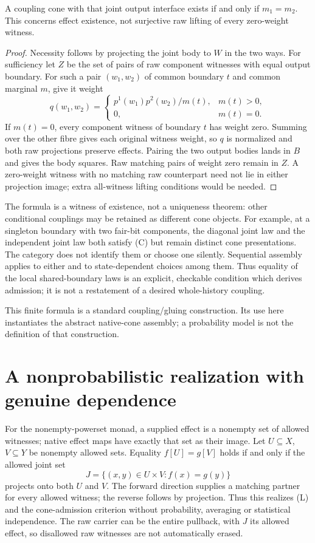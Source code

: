 \documentclass[11pt]{article}
\begin{document}
\begin{proposition}
A coupling cone with that joint output interface exists if and only if $m_1=m_2$. This concerns effect existence, not surjective raw lifting of every zero-weight witness.
\end{proposition}
\begin{proof}
Necessity follows by projecting the joint body to $W$ in the two ways. For sufficiency let $Z$ be the set of pairs of raw component witnesses with equal output boundary. For such a pair $(w_1,w_2)$ of common boundary $t$ and common marginal $m$, give it weight
\[
 q(w_1,w_2)=\begin{cases}
 p^1(w_1)p^2(w_2)/m(t),&m(t)>0,\\
 0,&m(t)=0.
 \end{cases}
\]
If $m(t)=0$, every component witness of boundary $t$ has weight zero. Summing over the other fibre gives each original witness weight, so $q$ is normalized and both raw projections preserve effects. Pairing the two output bodies lands in $B$ and gives the body squares. Raw matching pairs of weight zero remain in $Z$. A zero-weight witness with no matching raw counterpart need not lie in either projection image; extra all-witness lifting conditions would be needed.
\end{proof}

The formula is a witness of existence, not a uniqueness theorem: other conditional couplings may be retained as different cone objects. For example, at a singleton boundary with two fair-bit components, the diagonal joint law and the independent joint law both satisfy (C) but remain distinct cone presentations. The category does not identify them or choose one silently. Sequential assembly applies to either and to state-dependent choices among them. Thus equality of the local shared-boundary laws is an explicit, checkable condition which derives admission; it is not a restatement of a desired whole-history coupling.

This finite formula is a standard coupling/gluing construction. Its use here instantiates the abstract native-cone assembly; a probability model is not the definition of that construction.

\section{A nonprobabilistic realization with genuine dependence}
For the nonempty-powerset monad, a supplied effect is a nonempty set of allowed witnesses; native effect maps have exactly that set as their image. Let $U\subseteq X$, $V\subseteq Y$ be nonempty allowed sets. Equality $f[U]=g[V]$ holds if and only if the allowed joint set
\[
 J=\{(x,y)\in U\times V:f(x)=g(y)\}
\]
projects onto both $U$ and $V$. The forward direction supplies a matching partner for every allowed witness; the reverse follows by projection. Thus this realizes (L) and the cone-admission criterion without probability, averaging or statistical independence. The raw carrier can be the entire pullback, with $J$ its allowed effect, so disallowed raw witnesses are not automatically erased.
\end{document}
